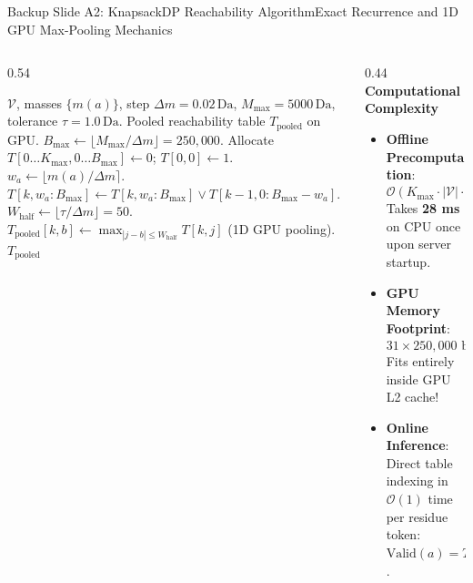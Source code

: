 \documentclass[aspectratio=169, 10pt]{beamer}
\begin{document}
\begin{frame}{Backup Slide A2: KnapsackDP Reachability Algorithm}{Exact Recurrence and 1D GPU Max-Pooling Mechanics}
\scriptsize
\begin{columns}[T]
\begin{column}{0.54\textwidth}
  \begin{algorithm}[H]
  \caption{\tiny KnapsackDP Precomputation}
  \begin{algorithmic}[1]\tiny
  \Require $\mathcal{V}$, masses $\{m(a)\}$, step $\Delta m = 0.02\,\text{Da}$, $M_{\max}=5000\,\text{Da}$, tolerance $\tau=1.0\,\text{Da}$.
  \Ensure Pooled reachability table $T_{\text{pooled}}$ on GPU.
  \State $B_{\max} \gets \lfloor M_{\max}/\Delta m \rfloor = 250{,}000$.
  \State Allocate $T[0 \dots K_{\max}, 0 \dots B_{\max}] \gets 0$; $T[0, 0] \gets 1$.
      \State $w_a \gets \lfloor m(a)/\Delta m \rceil$.
      \State $T[k, w_a : B_{\max}] \gets T[k, w_a : B_{\max}] \lor T[k-1, 0 : B_{\max}-w_a]$.
    \EndFor
  \EndFor
  \State $W_{\text{half}} \gets \lfloor \tau/\Delta m \rfloor = 50$.
  \State $T_{\text{pooled}}[k, b] \gets \max_{|j - b| \le W_{\text{half}}} T[k, j]$ (1D GPU pooling).
  \State \Return $T_{\text{pooled}}$
  \end{algorithmic}
  \end{algorithm}
\end{column}

\begin{column}{0.44\textwidth}
  \textbf{\footnotesize Computational Complexity}
  \begin{itemize}\setlength{\itemsep}{2pt}\tiny
    \item \textbf{Offline Precomputation}:
    \begin{equation*}
      \mathcal{O}(K_{\max} \cdot |\mathcal{V}| \cdot B_{\max}) \approx 30 \times 22 \times 250{,}000 \approx 1.65 \times 10^8 \text{ ops}
    \end{equation*}
    Takes \textbf{28 ms} on CPU once upon server startup.
    \item \textbf{GPU Memory Footprint}:
    \begin{equation*}
      31 \times 250{,}000 \text{ booleans} = 7.75 \times 10^6 \text{ bytes} \approx \mathbf{7.39\,\text{MB}}
    \end{equation*}
    Fits entirely inside GPU L2 cache!
    \item \textbf{Online Inference}:
    Direct table indexing in $\mathcal{O}(1)$ time per residue token: $\text{Valid}(a) = T_{\text{pooled}}[k-1, \text{bin}]$.
  \end{itemize}
\end{column}
\end{columns}
\end{frame}
\end{document}
